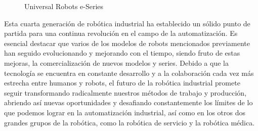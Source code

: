   \begin{figure}[H]
    \begin{center}
      \subcapcentertrue
      \hspace{2mm}
    \end{center}
    \caption{Universal Robots e-Series}
    \label{fig:UR_e-Series}
  \end{figure}
	  
Esta cuarta generación de robótica industrial ha establecido un sólido punto de partida para una continua revolución en el campo de la automatización. 
Es esencial destacar que varios de los modelos de robots mencionados previamente han seguido evolucionando y mejorando con el tiempo, siendo fruto de estas mejoras, la comercialización de nuevos modelos y series. 
Debido a que la tecnología se encuentra en constante desarrollo y a la colaboración cada vez más estrecha entre humanos y robots, el futuro de la robótica industrial promete seguir transformando radicalmente nuestros métodos de trabajo y producción, abriendo así nuevas oportunidades y desafiando constantemente los límites de lo que podemos lograr en la automatización industrial, así como en los otros dos grandes grupos de la robótica, como la robótica de servicio y la robótica médica.


